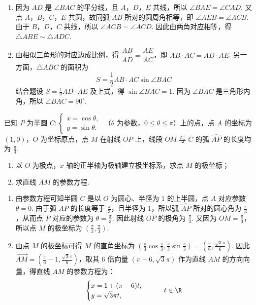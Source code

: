 \begin{solution}
\begin{enumerate}
\item 因为 \(AD\) 是 \(\angle BAC\) 的平分线，且 \(A\)，\(D\)，\(E\) 共线，所以 \(\angle BAE=\angle CAD\). 又点 \(A\)，\(B\)，\(C\)，\(E\) 共圆，故同弧 \(AB\) 所对的圆周角相等，即 \(\angle AEB=\angle ACB\). 由于 \(B\)，\(D\)，\(C\) 共线，所以 \(\angle ACB=\angle ACD\). 因此由两角对应相等，得 \(\triangle ABE\sim\triangle ADC\).
\item 由相似三角形的对应边成比例，得 \(\dfrac{AB}{AD}=\dfrac{AE}{AC}\)，即 \(AB\cdot AC=AD\cdot AE\). 另一方面，\(\triangle ABC\) 的面积为
\[
S=\frac{1}{2}AB\cdot AC\sin\angle BAC
\]
结合题设 \(S=\frac{1}{2}AD\cdot AE\) 及上式，得 \(\sin\angle BAC=1\). 因为 \(\angle BAC\) 是三角形内角，所以 \(\angle BAC=90^{\circ}\).
\end{enumerate}
\end{solution}

\begin{problem}
已知 \(P\) 为半圆 \(C:\begin{cases}
x = \cos \theta,\\
y = \sin \theta.
\end{cases}\) （\(\theta\) 为参数，\(0 \leqslant \theta \leqslant \pi\)）上的点，点 \(A\) 的坐标为 \((1,0)\)，\(O\) 为坐标原点，点 \(M\) 在射线 \(OP\) 上，线段 \(OM\) 与 \(C\) 的弧 \(\widehat{AP}\) 的长度均为 \(\frac{\pi}{3}\).

\begin{enumerate}
\item 以 \(O\) 为极点，\(x\) 轴的正半轴为极轴建立极坐标系，求点 \(M\) 的极坐标；
\item 求直线 \(AM\) 的参数方程.
\end{enumerate}
\end{problem}

\begin{solution}
\begin{enumerate}
\item 由参数方程可知半圆 \(C\) 是以 \(O\) 为圆心、半径为 \(1\) 的上半圆，点 \(A\) 对应参数 \(\theta=0\). 由于弧 \(\widehat{AP}\) 的长度等于 \(\frac{\pi}{3}\)，且半径为 \(1\)，所以弧 \(\widehat{AP}\) 所对的圆心角为 \(\frac{\pi}{3}\)，从而点 \(P\) 对应的参数为 \(\theta=\frac{\pi}{3}\). 因此射线 \(OP\) 的极角为 \(\frac{\pi}{3}\). 又因为 \(OM=\frac{\pi}{3}\)，所以点 \(M\) 的极坐标为 \(\left(\frac{\pi}{3},\frac{\pi}{3}\right)\).
\item 由点 \(M\) 的极坐标可得 \(M\) 的直角坐标为 \(\left(\frac{\pi}{3}\cos\frac{\pi}{3},\frac{\pi}{3}\sin\frac{\pi}{3}\right)=\left(\frac{\pi}{6},\frac{\sqrt{3}\pi}{6}\right)\). 因此 \(\overrightarrow{AM}=\left(\frac{\pi}{6}-1,\frac{\sqrt{3}\pi}{6}\right)\)，取其 \(6\) 倍向量 \((\pi-6,\sqrt{3}\pi)\) 作为直线 \(AM\) 的方向向量，得直线 \(AM\) 的参数方程为：
\[
\begin{cases}
x=1+(\pi-6)t,\\
y=\sqrt{3}\pi t,
\end{cases}\qquad t\in\R
\]
\end{enumerate}
\end{solution}


